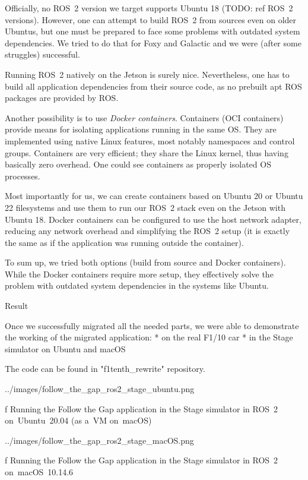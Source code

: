 Officially, no ROS~2 version we target supports Ubuntu 18 (TODO: ref ROS~2 versions). However, one can attempt to build ROS~2 from sources even on older Ubuntus, but one must be prepared to face some problems with outdated system dependencies. We tried to do that for Foxy and Galactic and we were (after some struggles) successful.

Running ROS~2 natively on the Jetson is surely nice. Nevertheless, one has to build all application dependencies from their source code, as no prebuilt apt ROS packages are provided by ROS.

Another possibility is to use {\em Docker containers}. Containers (OCI containers) provide means for isolating applications running in the same OS. They are implemented using native Linux features, most notably namespaces and control groups. Containers are very efficient; they share the Linux kernel, thus having basically zero overhead. One could see containers as properly isolated OS processes.

Most importantly for us, we can create containers based on Ubuntu 20 or Ubuntu 22 filesystems and use them to run our ROS~2 stack even on the Jetson with Ubuntu 18. Docker containers can be configured to use the host network adapter, reducing any network overhead and simplifying the ROS~2 setup (it is exactly the same as if the application was running outside the container).

To sum up, we tried both options (build from source and Docker containers). While the Docker containers require more setup, they effectively solve the problem with outdated system dependencies in the systems like Ubuntu.


\sec Result

Once we successfully migrated all the needed parts, we were able to demonstrate the working of the migrated application:
\begitems
* {\sbf on the real F1/10 car}
* in the Stage simulator on Ubuntu and macOS
\enditems

The code can be found in "f1tenth_rewrite" repository.

\midinsert
{}
\picw=14cm \cinspic ../images/follow_the_gap_ros2_stage_ubuntu.png
\caption/f Running the Follow the Gap application in the Stage simulator in ROS~2 on~Ubuntu~20.04 (as a~VM on~macOS)
\endinsert

\midinsert
{}
\picw=14cm \cinspic ../images/follow_the_gap_ros2_stage_macOS.png
\caption/f Running the Follow the Gap application in the Stage simulator in ROS~2 \hbox{on~macOS~10.14.6}
\endinsert
